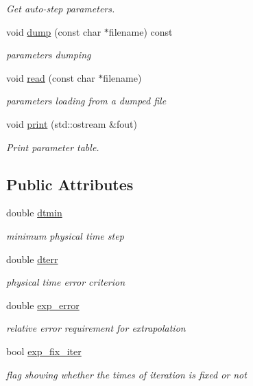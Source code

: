 \begin{DoxyCompactItemize}
\begin{DoxyCompactList}\small\item\em Get auto-\/step parameters. \end{DoxyCompactList}\item 
void \hyperlink{classARC_1_1chainpars_a926438a652307d24bd8a03b0ca926382}{dump} (const char $\ast$filename) const
\begin{DoxyCompactList}\small\item\em parameters dumping \end{DoxyCompactList}\item 
void \hyperlink{classARC_1_1chainpars_a68f92497bf003803c01fee179d0db68f}{read} (const char $\ast$filename)
\begin{DoxyCompactList}\small\item\em parameters loading from a dumped file \end{DoxyCompactList}\item 
void \hyperlink{classARC_1_1chainpars_a3bd667353d49614c52ad6c965a7480f3}{print} (std\+::ostream \&fout)
\begin{DoxyCompactList}\small\item\em Print parameter table. \end{DoxyCompactList}\end{DoxyCompactItemize}
\subsection*{Public Attributes}
\begin{DoxyCompactItemize}
\item 
double \hyperlink{classARC_1_1chainpars_ac414014d19915aecb35245ba11649c2e}{dtmin}
\begin{DoxyCompactList}\small\item\em minimum physical time step \end{DoxyCompactList}\item 
double \hyperlink{classARC_1_1chainpars_ad3a3e8f9199180ec82b9c257b1e8570e}{dterr}
\begin{DoxyCompactList}\small\item\em physical time error criterion \end{DoxyCompactList}\item 
double \hyperlink{classARC_1_1chainpars_a7ee477ebe8b1d67457891ab58560c074}{exp\+\_\+error}
\begin{DoxyCompactList}\small\item\em relative error requirement for extrapolation \end{DoxyCompactList}\item 
bool \hyperlink{classARC_1_1chainpars_a3f16e6ea9497e294265c4a17df0394ba}{exp\+\_\+fix\+\_\+iter}
\begin{DoxyCompactList}\small\item\em flag showing whether the times of iteration is fixed or not \end{DoxyCompactList}\end{DoxyCompactItemize}
